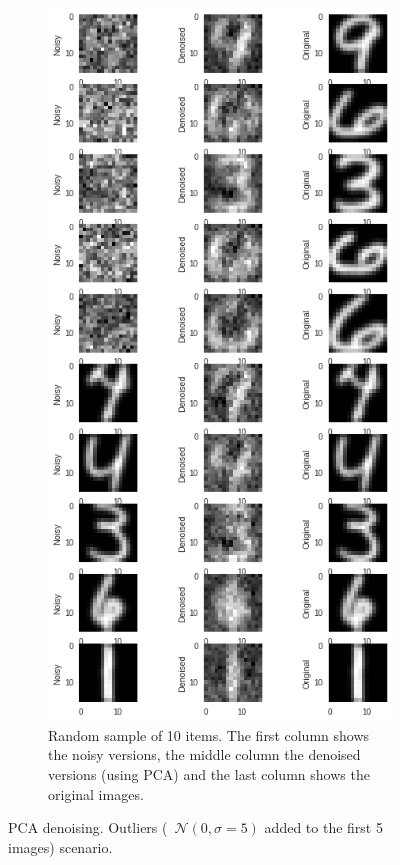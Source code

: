 \documentclass[a4paper,11pt]{article}
\begin{document}
\begin{figure}
\begin{subfigure}[t]{0.45\textwidth}
		\includegraphics[width=\textwidth]{images/assignment5-3-out2.png}
		\caption{Random sample of 10 items. The first column shows the noisy versions, the middle column the denoised versions (using PCA) and the last column shows the original images.}
		\label{fig:assignment5-3-out2}
	\end{subfigure}
	\caption{PCA denoising. Outliers (~$\mathcal{N}(0, \sigma=5)$ added to the first 5 images) scenario.}
	\label{fig:assignment5-3-out}
\end{figure}
\end{document}
